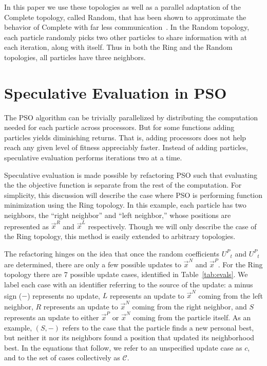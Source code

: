 \documentclass{llncs}
\providecommand{\pers}{\ensuremath{P}}
\providecommand{\neigh}{\ensuremath{N}}
\providecommand{\leftind}{\ensuremath{L}}
\providecommand{\rightind}{\ensuremath{R}}
\providecommand{\pURand}{\ensuremath{U^\pers}}
\providecommand{\nbest}{\ensuremath{\Vec{x}^\neigh}}
\providecommand{\pbest}{\ensuremath{\Vec{x}^\pers}}
\providecommand{\leftn}{\ensuremath{\Vec{x}^\leftind}}
\providecommand{\rightn}{\ensuremath{\Vec{x}^\rightind}}
\providecommand{\caseset}{\ensuremath{\mathcal{C}}}
\providecommand{\casegen}{\ensuremath{c}}
\providecommand{\casexn}{\ensuremath{(S,-)}}
\begin{document}
In this paper we use these topologies as well as a parallel adaptation of the
Complete topology, called Random, that has been shown to approximate the
behavior of Complete with far less
communication~\cite{mcnabb-2009-large-particle-swarms}.  In the Random
topology, each particle randomly picks two other particles to share information
with at each iteration, along with itself.  Thus in both the Ring and the
Random topologies, all particles have three neighbors.

\section{Speculative Evaluation in PSO}
\label{sec:sepso}

The PSO algorithm can be trivially parallelized by distributing the computation
needed for each particle across processors.  But for some functions adding
particles yields diminishing returns.  That is, adding processors does not help
reach any given level of fitness appreciably faster.  Instead of adding
particles, speculative evaluation performs iterations two at a time.

Speculative evaluation is made possible by refactoring
PSO such that evaluating the
the objective function is separate from the rest of the computation.  For
simplicity, this discussion will describe the case where PSO is performing
function minimization using the Ring topology.  In this example, each particle
has two neighbors, the ``right neighbor'' and ``left neighbor,'' whose
positions are represented as $\rightn$ and $\leftn$ respectively.  Though we
will only describe the case of the Ring topology, this method is easily
extended to arbitrary topologies.

The refactoring hinges on the idea that once the random coefficients
$\pURand_{t}$ and $\pURand_{t}$ are determined, there are only a few possible
updates to $\nbest$ and $\pbest$.  For the Ring topology there are 7 possible
update cases, identified in Table~\ref{tab:evals}.  We label each case with an
identifier referring to the source of the update: a minus sign ($-$) represents
no update, $L$ represents an update to $\nbest$ coming from the left neighbor,
$R$ represents an update to $\nbest$ coming from the right neighbor, and $S$
represents an update to either $\pbest$ or $\nbest$ coming from the particle
itself.  As an example, $\casexn$ refers to the case that the particle finds a
new personal best, but neither it nor its neighbors found a position that
updated its neighborhood best.  In the equations that follow, we refer to an
unspecified update case as $\casegen$, and to the set of cases collectively as
$\caseset$.
\end{document}
